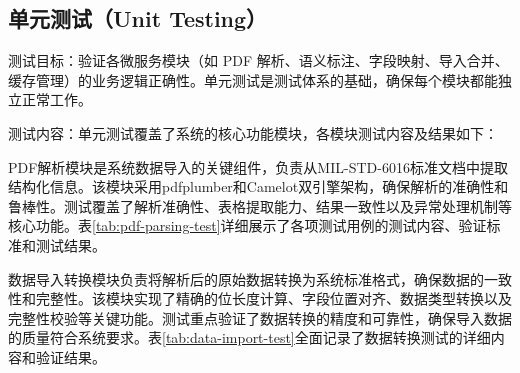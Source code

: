 \subsection{单元测试（Unit Testing）}

测试目标：验证各微服务模块（如 PDF 解析、语义标注、字段映射、导入合并、缓存管理）的业务逻辑正确性。单元测试是测试体系的基础，确保每个模块都能独立正常工作。

测试内容：单元测试覆盖了系统的核心功能模块，各模块测试内容及结果如下：

PDF解析模块是系统数据导入的关键组件，负责从MIL-STD-6016标准文档中提取结构化信息。该模块采用pdfplumber和Camelot双引擎架构，确保解析的准确性和鲁棒性。测试覆盖了解析准确性、表格提取能力、结果一致性以及异常处理机制等核心功能。表\ref{tab:pdf-parsing-test}详细展示了各项测试用例的测试内容、验证标准和测试结果。

\begin{table}[H]
\centering
\caption{PDF解析模块单元测试结果}
\label{tab:pdf-parsing-test}
\end{table}

数据导入转换模块负责将解析后的原始数据转换为系统标准格式，确保数据的一致性和完整性。该模块实现了精确的位长度计算、字段位置对齐、数据类型转换以及完整性校验等关键功能。测试重点验证了数据转换的精度和可靠性，确保导入数据的质量符合系统要求。表\ref{tab:data-import-test}全面记录了数据转换测试的详细内容和验证结果。

\begin{table}[H]
\centering
\caption{数据导入转换模块单元测试结果}
\label{tab:data-import-test}
\end{table}

